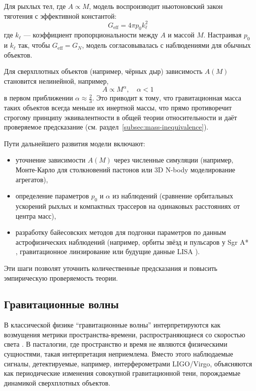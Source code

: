 \documentclass[pdflatex,sn-mathphys-num,referee]{sn-jnl}
\begin{document}
Для рыхлых тел, где \( A \propto M \), модель воспроизводит ньютоновский закон тяготения \cite{newton1687-principia, halliday2013-fundamentals} с эффективной константой:
\[
G_{\text{eff}} = 4\pi p_0 k_\ell^2
\]
где \( k_\ell \) --- коэффициент пропорциональности между \( A \) и массой \( M \). Настраивая \( p_0 \) и \( k_\ell \) так, чтобы \( G_{\text{eff}} = G_N \), модель согласовывалась с наблюдениями для обычных объектов.

Для сверхплотных объектов (например, чёрных дыр) зависимость \( A(M) \) становится нелинейной, например,
\[
A \propto M^\alpha, \quad \alpha < 1
\]
в первом приближении \( \alpha \approx \frac{2}{3} \). Это приводит к тому, что гравитационная масса таких объектов всегда меньше их инертной массы, что прямо противоречит строгому принципу эквивалентности в общей теории относительности и даёт проверяемое предсказание (см. раздел~\ref{subsec:mass-inequivalence}).

Пути дальнейшего развития модели включают:
\begin{itemize}
    \item уточнение зависимости \( A(M) \) через численные симуляции \cite{newman2013-computational} (например, Монте-Карло для столкновений пастонов или 3D N-body моделирование агрегатов),
    \item определение параметров \( p_0 \) и \( \alpha \) из наблюдений (сравнение орбитальных ускорений рыхлых и компактных трассеров на одинаковых расстояниях от центра масс),
    \item разработку байесовских методов для подгонки параметров по данным астрофизических наблюдений (например, орбиты звёзд и пульсаров у Sgr A* \cite{ghez2008-sgrA}, гравитационное линзирование \cite{schneider2006-lensing} или будущие данные LISA \cite{lisa-consortium2017}).
\end{itemize}
Эти шаги позволят уточнить количественные предсказания и повысить эмпирическую проверяемость теории.

\subsection{Гравитационные волны}\label{subsec:gravitational-waves}

В классической физике ``гравитационные волны'' интерпретируются как возмущения метрики пространства-времени, распространяющиеся со скоростью света \cite{ligo2016-detection}. В пасталогии, где пространство и время не являются физическими сущностями, такая интерпретация неприемлема. Вместо этого наблюдаемые сигналы, детектируемые, например, интерферометрами LIGO/Virgo, объясняются как периодические изменения совокупной гравитационной тени, порождаемые динамикой сверхплотных объектов.
\end{document}
